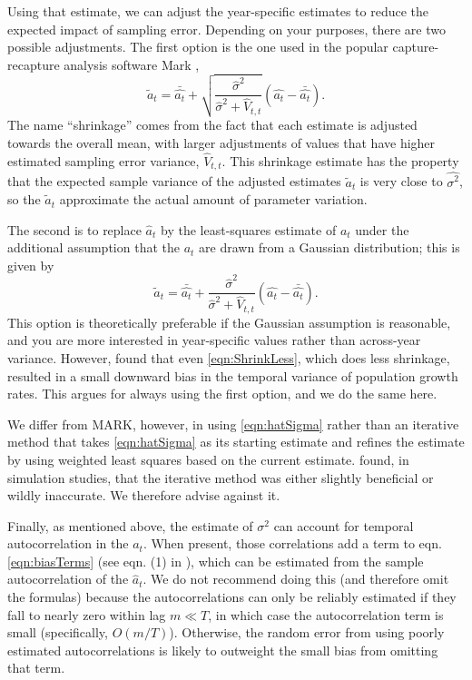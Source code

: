 \documentclass[12pt]{article}
\newcommand{\be}{\begin{equation}}
\newcommand{\ee}{\end{equation}}
\begin{document}
Using that estimate, we can adjust the year-specific estimates to reduce the expected 
impact of sampling error. Depending on your purposes, there are two possible adjustments. 
The first option is the one used in the popular capture-recapture analysis 
software Mark \citet{cooch-white-2020}, 
\be
\widetilde{a}_t = \bar{\hat{a_t}} + \sqrt{\frac{\hat{\sigma}^2}{\hat{\sigma}^2 + \hat{V}_{t,t}}}\left (\hat{a_t} - \bar{\hat{a_t}} \right). 
\label{eqn:ShrinkLess}
\ee
The name ``shrinkage'' comes from the fact that each estimate is adjusted towards the overall mean, with 
larger adjustments of values that have higher estimated sampling error variance, $\hat{V}_{t,t}$. 
This shrinkage estimate has the property that the expected sample variance of the 
adjusted estimates $\widetilde{a}_t$ is very close to $\hat{\sigma^2}$, so the $\widetilde{a}_t$ approximate
the actual amount of parameter variation. 

The second is to replace $\hat{a}_t$ by the least-squares estimate of $a_t$ under the 
additional assumption that the $a_t$ are drawn from a Gaussian distribution; this is given by 
\be
\widetilde{a}_t = \bar{\hat{a_t}} + \frac{\hat{\sigma}^2}{\hat{\sigma}^2 + \hat{V}_{t,t}}\left (\hat{a_t} - \bar{\hat{a_t}} \right). 
\label{eqn:ShrinkMore}
\ee
This option is theoretically preferable if the Gaussian assumption is reasonable, and you are more interested in year-specific values rather 
than across-year variance. However, \citet{metcalf-etal-2015} found that even \eqref{eqn:ShrinkLess}, which does 
less shrinkage, resulted in a small downward bias in the temporal variance of population growth rates. This argues for  
always using the first option, and we do the same here. 

We differ from MARK, however, in using \eqref{eqn:hatSigma} rather than an iterative method that takes \eqref{eqn:hatSigma} as its 
starting estimate and refines the estimate by using weighted least squares based on the current estimate. 
\citet{metcalf-etal-2015} found, in simulation studies, that the iterative method was either slightly beneficial 
or wildly inaccurate. We therefore advise against it. 

Finally, as mentioned above, the estimate of $\sigma^2$ can account for temporal autocorrelation in the $a_t$. 
When present, those correlations add a term to eqn. \eqref{eqn:biasTerms} (see eqn. (1) in \citet{gould-nichols-1998}), 
which can be estimated from the sample autocorrelation of the $\hat{a}_t$. We do not recommend doing this (and therefore omit
the formulas) because the autocorrelations can only be reliably estimated if they fall to nearly zero within lag $m \ll T$, in which
case the autocorrelation term is small (specifically, $O(m/T)$). Otherwise, the random error from using poorly estimated 
autocorrelations is likely to outweight the small bias from omitting that term. 
\end{document}
